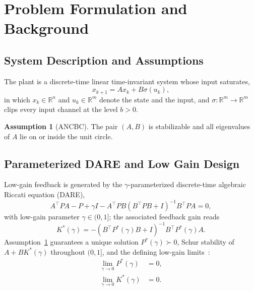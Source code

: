 \documentclass[final,5p,times,authoryear]{elsarticle}
\theoremstyle{plain}
\theoremstyle{definition}
\newtheorem{assumption}{Assumption}
\theoremstyle{remark}
\begin{document}
\section{Problem Formulation and Background}\label{sec:problem}

\subsection{System Description and Assumptions}

The plant is a discrete-time linear time-invariant system whose input
saturates,
\begin{equation}
x_{k+1} = Ax_k + B\sigma(u_k),
\label{eq:system}
\end{equation}
in which $x_k \in \mathbb{R}^n$ and $u_k \in \mathbb{R}^m$ denote the state and the
input, and $\sigma : \mathbb{R}^m \to \mathbb{R}^m$ clips every input channel at the
level $b > 0$.

\begin{assumption}[ANCBC]\label{assum:ANCBC}
The pair $(A, B)$ is stabilizable and all eigenvalues of $A$ lie on or
inside the unit circle.
\end{assumption}

\subsection{Parameterized DARE and Low Gain Design}

Low-gain feedback is generated by the $\gamma$-parameterized
discrete-time algebraic Riccati equation (DARE),
\begin{equation}
A^\top\! PA - P + \gamma I
  - A^\top\! PB(B^\top\! PB + I)^{-1}B^\top\! PA = 0,
\label{eq:DARE}
\end{equation}
with low-gain parameter $\gamma \in (0,1]$; the associated feedback
gain reads
\begin{equation}
K^*(\gamma)
   = -(B^\top P^*(\gamma) B + I)^{-1} B^\top P^*(\gamma) A.
\label{eq:optimal_gain}
\end{equation}
Assumption~\ref{assum:ANCBC} guarantees a unique solution
$P^*(\gamma) \succ 0$, Schur stability of $A + BK^*(\gamma)$
throughout $(0,1]$, and the defining low-gain
limits~\citep{Lin1998}:
\begin{align}
\lim_{\gamma \to 0} P^*(\gamma) &= 0, \label{eq:P_limit} \\
\lim_{\gamma \to 0} K^*(\gamma) &= 0. \label{eq:K_limit}
\end{align}
\end{document}
